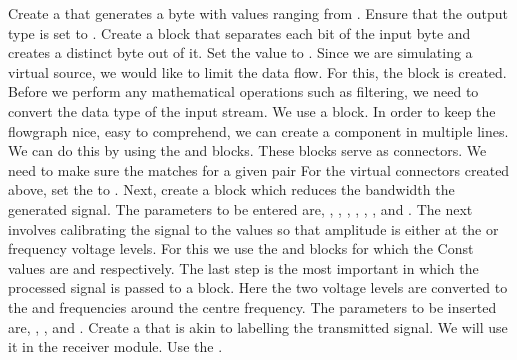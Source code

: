 \documentclass[11pt]{article}
\begin{document}
\begin{outline}[enumerate]
  \1 Create a  that generates a byte with values ranging from . Ensure that the output type is set to .
  \1 Create a  block that separates each bit of the input byte and creates a distinct byte out of it. Set the  value to .
  \1 Since we are simulating a virtual source, we would like to limit the data flow. For this, the  block is created.
  \1 Before we perform any mathematical operations such as filtering, we need to convert the data type of the input stream. We use a \newline {} block.
  \1 In order to keep the flowgraph nice, easy to comprehend, we can create a component in multiple lines. We can do this by using the  and  blocks. These blocks serve as connectors. We need to make sure the  matches for a given pair
  \1 For the virtual connectors created above, set the  to \newline {}.
  \1 Next, create a  block which reduces the bandwidth the generated signal. The parameters to be entered are, \newline {}, , \newline {},  , , \newline {},  and .
  \1 The next involves calibrating the signal to the values so that amplitude is either at the  or  frequency voltage levels. For this we use the  and  blocks for which the Const values are  and  respectively.
  \1 The last step is the most important in which the processed signal is passed to a  block. Here the two voltage levels are converted to the  and  frequencies around the centre frequency. The parameters to be inserted are, , , and .
  \1 Create a  that is akin to labelling the transmitted signal. We will use it in the receiver module. Use the \newline {}.
\end{outline}
\end{document}
